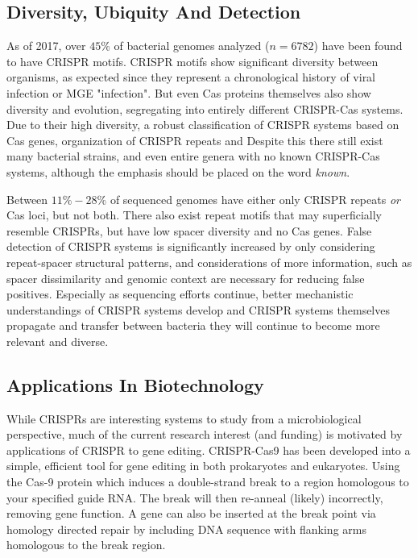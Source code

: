 \documentclass[12pt,letter]{article}
\begin{document}
\subsection{Diversity, Ubiquity And Detection}
As of 2017, over $45\%$ of bacterial genomes analyzed ($n=6782$) have been found to have CRISPR motifs\citep{crispdb}.
CRISPR motifs show significant diversity between organisms, as expected since they represent a chronological history of viral infection or MGE "infection"\citep{crispgen}.
But even Cas proteins themselves also show diversity and evolution, segregating into entirely different CRISPR-Cas systems\citep{evocas}.
Due to their high diversity, a robust classification of CRISPR systems based on Cas genes, organization of CRISPR repeats and
Despite this there still exist many bacterial strains, and even entire genera with no known CRISPR-Cas systems, although the emphasis should be placed on the word \textit{known}\citep{ineqcas}.\par
Between $11\%-28\%$ of sequenced genomes have either only CRISPR repeats \textit{or} Cas loci, but not both\citep{ineqcas}.
There also exist repeat motifs that may superficially resemble CRISPRs, but have low spacer diversity and no Cas genes\citep{ineqcas}.
False detection of CRISPR systems is significantly increased by only considering repeat-spacer structural patterns, and considerations of more information, such as spacer dissimilarity and genomic context are necessary for reducing false positives\citep{ineqcas}.
Especially as sequencing efforts continue, better mechanistic understandings of CRISPR systems develop and CRISPR systems themselves propagate and transfer between bacteria they will continue to become more relevant and diverse.
\subsection{Applications In Biotechnology}
While CRISPRs are interesting systems to study from a microbiological perspective, much of the current research interest (and funding) is motivated by applications of CRISPR to gene editing.
CRISPR-Cas9 has been developed into a simple, efficient tool for gene editing in both prokaryotes and eukaryotes\citep{crispgen}.
Using the Cas-9 protein which induces a double-strand break to a region homologous to your specified guide RNA.
The break will then  re-anneal (likely) incorrectly, removing gene function\citep{crispgen}.
A gene can also be inserted at the break point via homology directed repair by including DNA sequence with flanking arms homologous to the break region\citep{crispgen}.
\end{document}
